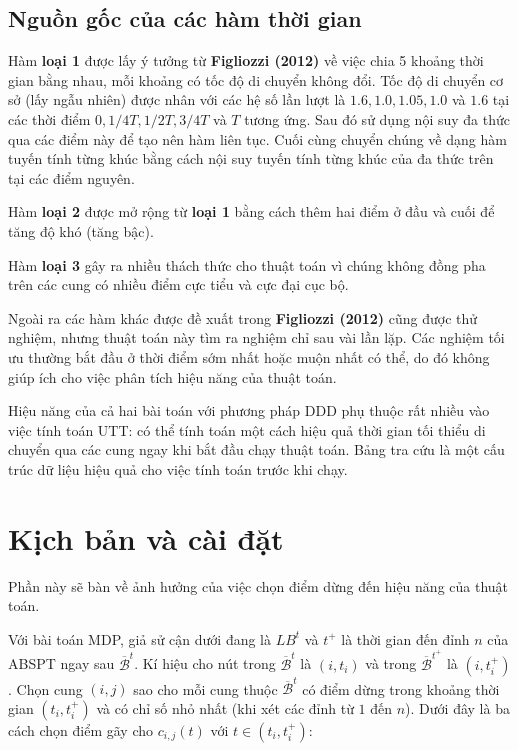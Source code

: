 \documentclass[../main.tex]{subfiles}
\begin{document}
\subsection{Nguồn gốc của các hàm thời
gian}\label{nguux1ed3n-gux1ed1c-cux1ee7a-cuxe1c-huxe0m-thux1eddi-gian}

Hàm \textbf{loại 1} được lấy ý tưởng từ \textbf{Figliozzi (2012)} về
việc chia 5 khoảng thời gian bằng nhau, mỗi khoảng có tốc độ di chuyển
không đổi. Tốc độ di chuyển cơ sở (lấy ngẫu nhiên) được nhân với các hệ
số lần lượt là \(1.6, 1.0, 1.05, 1.0\) và \(1.6\) tại các thời điểm
\(0, 1/4T, 1/2T, 3/4T\) và \(T\) tương ứng. Sau đó sử dụng nội suy đa
thức qua các điểm này để tạo nên hàm liên tục. Cuối cùng chuyển chúng về
dạng hàm tuyến tính từng khúc bằng cách nội suy tuyến tính từng khúc của
đa thức trên tại các điểm nguyên.

Hàm \textbf{loại 2} được mở rộng từ \textbf{loại 1} bằng cách thêm hai
điểm ở đầu và cuối để tăng độ khó (tăng bậc).

Hàm \textbf{loại 3} gây ra nhiều thách thức cho thuật toán vì chúng
không đồng pha trên các cung có nhiều điểm cực tiểu và cực đại cục bộ.

Ngoài ra các hàm khác được đề xuất trong \textbf{Figliozzi (2012)} cũng
được thử nghiệm, nhưng thuật toán này tìm ra nghiệm chỉ sau vài lần lặp.
Các nghiệm tối ưu thường bắt đầu ở thời điểm sớm nhất hoặc muộn nhất có
thể, do đó không giúp ích cho việc phân tích hiệu năng của thuật toán.

Hiệu năng của cả hai bài toán với phương pháp DDD phụ thuộc rất nhiều
vào việc tính toán UTT: có thể tính toán một cách hiệu quả thời gian tối
thiểu di chuyển qua các cung ngay khi bắt đầu chạy thuật toán. Bảng tra
cứu là một cấu trúc dữ liệu hiệu quả cho việc tính toán trước khi chạy.

\section{Kịch bản và cài
đặt}\label{kux1ecbch-bux1ea3n-vuxe0-cuxe0i-ux111ux1eb7t}

Phần này sẽ bàn về ảnh hưởng của việc chọn điểm dừng đến hiệu năng của
thuật toán.

Với bài toán MDP, giả sử cận dưới đang là \(LB^t\) và \(t^+\) là thời
gian đến đỉnh \(n\) của ABSPT ngay sau \(\overline{\mathcal{B}}^t\). Kí
hiệu cho nút trong \(\overline{\mathcal{B}}^t\) là \((i,t_i)\) và trong
\(\overline{\mathcal{B}}^{t^+}\) là \((i, t_i^+)\). Chọn cung \((i,j)\)
sao cho mỗi cung thuộc \(\overline{\mathcal{B}}^{t}\) có điểm dừng trong
khoảng thời gian \((t_i, t_i^+)\) và có chỉ số nhỏ nhất (khi xét các
đỉnh từ \(1\) đến \(n\)). Dưới đây là ba cách chọn điểm gãy cho
\(c_{i,j}(t)\) với \(t\in (t_i, t_i^+)\):
\end{document}
